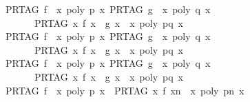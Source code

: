 \begin{isabellebody}
\ \ {\isachardoublequoteopen}{\isasymlbrakk}PR{\isacharunderscore}TAG\ f\ {\isacharequal}\ {\isacharparenleft}{\isasymlambda}x{\isachardot}\ poly\ p\ x{\isacharparenright}{\isacharsemicolon}\ PR{\isacharunderscore}TAG\ g\ {\isacharequal}\ {\isacharparenleft}{\isasymlambda}x{\isachardot}\ poly\ q\ x{\isacharparenright}{\isasymrbrakk}\isanewline
\ \ \ \ \ \ \ {\isasymLongrightarrow}\ PR{\isacharunderscore}TAG\ {\isacharparenleft}{\isasymlambda}x{\isachardot}\ f\ x\ {\isacharplus}\ g\ x{\isacharparenright}\ {\isacharequal}\ {\isacharparenleft}{\isasymlambda}x{\isachardot}\ poly\ {\isacharparenleft}p{\isacharplus}q{\isacharparenright}\ x{\isacharparenright}{\isachardoublequoteclose}\isanewline
\ \ {\isachardoublequoteopen}{\isasymlbrakk}PR{\isacharunderscore}TAG\ f\ {\isacharequal}\ {\isacharparenleft}{\isasymlambda}x{\isachardot}\ poly\ p\ x{\isacharparenright}{\isacharsemicolon}\ PR{\isacharunderscore}TAG\ g\ {\isacharequal}\ {\isacharparenleft}{\isasymlambda}x{\isachardot}\ poly\ q\ x{\isacharparenright}{\isasymrbrakk}\isanewline
\ \ \ \ \ \ \ {\isasymLongrightarrow}\ PR{\isacharunderscore}TAG\ {\isacharparenleft}{\isasymlambda}x{\isachardot}\ f\ x\ {\isacharminus}\ g\ x{\isacharparenright}\ {\isacharequal}\ {\isacharparenleft}{\isasymlambda}x{\isachardot}\ poly\ {\isacharparenleft}p{\isacharminus}q{\isacharparenright}\ x{\isacharparenright}{\isachardoublequoteclose}\isanewline
\ \ {\isachardoublequoteopen}{\isasymlbrakk}PR{\isacharunderscore}TAG\ f\ {\isacharequal}\ {\isacharparenleft}{\isasymlambda}x{\isachardot}\ poly\ p\ x{\isacharparenright}{\isacharsemicolon}\ PR{\isacharunderscore}TAG\ g\ {\isacharequal}\ {\isacharparenleft}{\isasymlambda}x{\isachardot}\ poly\ q\ x{\isacharparenright}{\isasymrbrakk}\isanewline
\ \ \ \ \ \ \ {\isasymLongrightarrow}\ PR{\isacharunderscore}TAG\ {\isacharparenleft}{\isasymlambda}x{\isachardot}\ f\ x\ {\isacharasterisk}\ g\ x{\isacharparenright}\ {\isacharequal}\ {\isacharparenleft}{\isasymlambda}x{\isachardot}\ poly\ {\isacharparenleft}p{\isacharasterisk}q{\isacharparenright}\ x{\isacharparenright}{\isachardoublequoteclose}\isanewline
\ \ {\isachardoublequoteopen}PR{\isacharunderscore}TAG\ f\ {\isacharequal}\ {\isacharparenleft}{\isasymlambda}x{\isachardot}\ poly\ p\ x{\isacharparenright}\ {\isasymLongrightarrow}\ PR{\isacharunderscore}TAG\ {\isacharparenleft}{\isasymlambda}x{\isachardot}\ {\isacharparenleft}f\ x{\isacharparenright}{\isacharcircum}n{\isacharparenright}\ {\isacharequal}\ {\isacharparenleft}{\isasymlambda}x{\isachardot}\ poly\ {\isacharparenleft}p{\isacharcircum}n{\isacharparenright}\ x{\isacharparenright}{\isachardoublequoteclose}\isanewline

\end{isabellebody}
